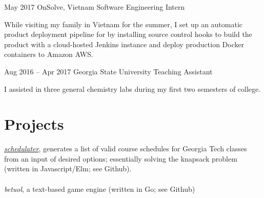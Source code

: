 \documentclass{tccv}
\begin{document}
\begin{minipage}[t]{0.65\textwidth}
\begin{eventlist}
\item{May 2017}
     {OnSolve, Vietnam}
     {Software Engineering Intern}

    While visiting my family in Vietnam for the summer, I set up an automatic product deployment pipeline for by installing source control hooks to build the product with a cloud-hosted Jenkins instance and deploy production Docker containers to Amazon AWS.

\item{Aug 2016 -- Apr 2017}
     {Georgia State University}
     {Teaching Assistant}

    I assisted in three general chemistry labs during my first two semesters of college.

\section{Projects}

\href{https://stnma7e.github.io/schedulater}{\emph{schedulater}}, generates a list of valid course schedules for Georgia Tech classes from an input of desired options; essentially solving the knapsack problem (written in Javascript/Elm; see Github). 
\\ \\
\emph{betuol}, a text-based game engine (written in Go; see Github)

\end{eventlist}
\end{minipage}
\end{document}
